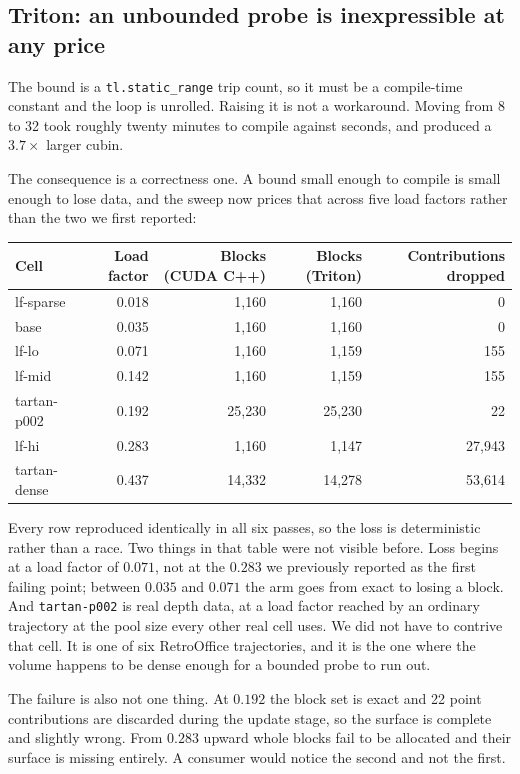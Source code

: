 \documentclass[11pt]{article}
\begin{document}
\subsection{Triton: an unbounded probe is inexpressible at any price}

The bound is a \texttt{tl.static\_range} trip count, so it must be a compile-time
constant and the loop is unrolled. Raising it is not a workaround. Moving from 8
to 32 took roughly twenty minutes to compile against seconds, and produced a
$3.7\times$ larger cubin.

The consequence is a correctness one. A bound small enough to compile is small
enough to lose data, and the sweep now prices that across five load factors
rather than the two we first reported:

\begin{center}
\begin{tabular}{lrrrr}
\toprule
Cell & Load factor & Blocks (CUDA C++) & Blocks (Triton) & Contributions dropped \\
\midrule
lf-sparse    & 0.018 & 1{,}160  & 1{,}160  & 0 \\
base         & 0.035 & 1{,}160  & 1{,}160  & 0 \\
lf-lo        & 0.071 & 1{,}160  & 1{,}159  & 155 \\
lf-mid       & 0.142 & 1{,}160  & 1{,}159  & 155 \\
tartan-p002  & 0.192 & 25{,}230 & 25{,}230 & 22 \\
lf-hi        & 0.283 & 1{,}160  & 1{,}147  & 27{,}943 \\
tartan-dense & 0.437 & 14{,}332 & 14{,}278 & 53{,}614 \\
\bottomrule
\end{tabular}
\end{center}

Every row reproduced identically in all six passes, so the loss is
deterministic rather than a race. Two things in that table were not visible
before. Loss begins at a load factor of $0.071$, not at the $0.283$ we
previously reported as the first failing point; between $0.035$ and $0.071$ the
arm goes from exact to losing a block. And \texttt{tartan-p002} is real depth
data, at a load factor reached by an ordinary trajectory at the pool size every
other real cell uses. We did not have to contrive that cell. It is one of six
RetroOffice trajectories, and it is the one where the volume happens to be
dense enough for a bounded probe to run out.

The failure is also not one thing. At $0.192$ the block set is exact and 22
point contributions are discarded during the update stage, so the surface is
complete and slightly wrong. From $0.283$ upward whole blocks fail to be
allocated and their surface is missing entirely. A consumer would notice the
second and not the first.
\end{document}
